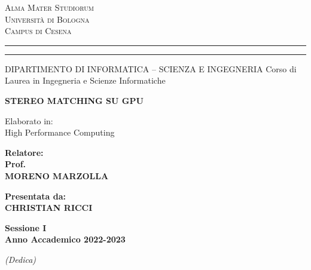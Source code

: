 \documentclass[12pt,a4paper,openright,twoside]{report}
\newcommand{\xstudent}{CHRISTIAN RICCI}
\newcommand{\xsupervisor}{MORENO MARZOLLA}
\begin{document}

\oddsidemargin=25pt

\begin{titlepage}
\begin{center}
    {\Large{\textsc{Alma Mater Studiorum}}}\\
    {\Large{\textsc{Universit\`a di Bologna}}} \\
    {\textsc{Campus di Cesena}}
    \rule[0.1cm]{14cm}{0.1mm}
    \rule[0.5cm]{14cm}{0.6mm}
    DIPARTIMENTO DI INFORMATICA – SCIENZA E INGEGNERIA
    Corso di Laurea in Ingegneria e Scienze Informatiche
\end{center}

\vspace{15mm}

\begin{center}
    {\LARGE{\bf STEREO MATCHING SU GPU}} \\
\end{center}

\vspace{15mm}

\begin{center}
     \large{ Elaborato in:\\ High Performance Computing\\}
\end{center}

\vspace{20mm}
\par
\noindent

\begin{minipage}[t]{0.47\textwidth}
    {\large{\bf Relatore:\\ Prof.\\ \xsupervisor}}
\end{minipage}
\hfill
\begin{minipage}[t]{0.47\textwidth}\raggedleft
    {\large{\bf Presentata da:\\ \xstudent}} \end{minipage}
\vspace{20mm}
\begin{center}
    \large{\bf Sessione I\\ Anno Accademico 2022-2023}
\end{center}

\clearpage{\pagestyle{empty}\cleardoublepage}

\thispagestyle{empty}
\topmargin=6.5cm
\raggedleft
\large
\em
(Dedica)
\clearpage{\pagestyle{empty}\cleardoublepage}
\end{titlepage}
\end{document}
